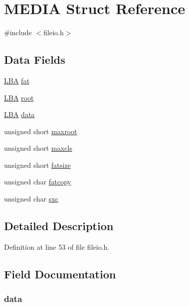 \hypertarget{struct_m_e_d_i_a}{\section{M\-E\-D\-I\-A Struct Reference}
\label{struct_m_e_d_i_a}
}


{\ttfamily \#include $<$fileio.\-h$>$}

\subsection*{Data Fields}
\begin{DoxyCompactItemize}
\item 
\hyperlink{p8_2pinguino_2libraries_2sd_2sdmmc_8h_ae191ab80499bded9e0668daa98faa849}{L\-B\-A} \hyperlink{struct_m_e_d_i_a_a8703e77c9af68598f5ba9fc70528c78e}{fat}
\item 
\hyperlink{p8_2pinguino_2libraries_2sd_2sdmmc_8h_ae191ab80499bded9e0668daa98faa849}{L\-B\-A} \hyperlink{struct_m_e_d_i_a_a484ff55c205f0fa8283a246f2d77f94d}{root}
\item 
\hyperlink{p8_2pinguino_2libraries_2sd_2sdmmc_8h_ae191ab80499bded9e0668daa98faa849}{L\-B\-A} \hyperlink{struct_m_e_d_i_a_af5fb805503cd2d43d97b89362bd48dc8}{data}
\item 
unsigned short \hyperlink{struct_m_e_d_i_a_a78f14f8c25b8a0d73de86c9c96e068f9}{maxroot}
\item 
unsigned short \hyperlink{struct_m_e_d_i_a_a188ac56cd2b9e488f7f16fec93bb02ab}{maxcls}
\item 
unsigned short \hyperlink{struct_m_e_d_i_a_a74af0e18d550fb61c6433afa4afcddae}{fatsize}
\item 
unsigned char \hyperlink{struct_m_e_d_i_a_af0c81f9f766295c07fd33e1040d38318}{fatcopy}
\item 
unsigned char \hyperlink{struct_m_e_d_i_a_ac9daa97bcbd38f1fda0f357dfa22aaa7}{sxc}
\end{DoxyCompactItemize}


\subsection{Detailed Description}


Definition at line 53 of file fileio.\-h.



\subsection{Field Documentation}
\hypertarget{struct_m_e_d_i_a_af5fb805503cd2d43d97b89362bd48dc8}{
\subsubsection[{data}]{ data}}\label{struct_m_e_d_i_a_af5fb805503cd2d43d97b89362bd48dc8}


